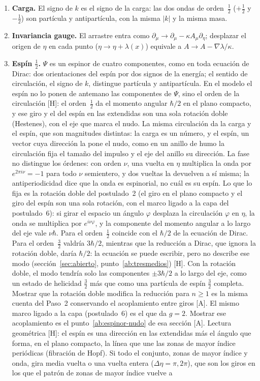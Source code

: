 \documentclass[11pt,a4paper]{article}
\newcommand{\st}[1]{\textup{[#1]}}
\begin{document}
\begin{enumerate}[label=\arabic*.,leftmargin=*]
\item \textbf{Carga.} El signo de $k$ es el signo de la carga: las dos ondas de orden~$\tfrac12$ ($+\tfrac12$ y $-\tfrac12$) son partícula y antipartícula, con la misma $|k|$ y la misma masa.

\item \textbf{Invariancia gauge.} El arrastre entra como $\partial_\mu\to\partial_\mu-\kappa A_\mu\partial_\eta$; desplazar el origen de $\eta$ en cada punto ($\eta\to\eta+\lambda(x)$) equivale a $A\to A-\nabla\lambda/\kappa$.

\item \label{it:espin}\textbf{Espín $\tfrac12$.} $\Psi$ es un espinor de cuatro componentes, como en toda ecuación de Dirac: dos orientaciones del espín por dos signos de la energía; el sentido de circulación, el signo de $k$, distingue partícula y antipartícula. En el modelo el espín no lo ponen de antemano las componentes de $\Psi$, sino el orden de la circulación \st{H}: el orden~$\tfrac12$ da el momento angular $\hbar/2$ en el plano compacto, y ese giro y el del espín en las extendidas son una sola rotación doble (Hestenes), con el eje que marca el nudo. La misma circulación da la carga y el espín, que son magnitudes distintas: la carga es un número, y el espín, un vector cuya dirección la pone el nudo, como en un anillo de humo la circulación fija el tamaño del impulso y el eje del anillo su dirección. La fase no distingue los órdenes: con orden $\nu$, una vuelta en $\eta$ multiplica la onda por $e^{2\pi i\nu}=-1$ para todo $\nu$ semientero, y dos vueltas la devuelven a sí misma; la antiperiodicidad dice que la onda es espinorial, no cuál es su espín. Lo que lo fija es la rotación doble del postulado~2 (el giro en el plano compacto y el giro del espín son una sola rotación, con el marco ligado a la capa del postulado~6): si girar el espacio un ángulo $\varphi$ desplaza la circulación $\varphi$ en $\eta$, la onda se multiplica por $e^{i\nu\varphi}$, y la componente del momento angular a lo largo del eje vale $\nu\hbar$. Para el orden~$\tfrac12$ coincide con el $\hbar/2$ de la ecuación de Dirac. Para el orden~$\tfrac32$ valdría $3\hbar/2$, mientras que la reducción a Dirac, que ignora la rotación doble, daría $\hbar/2$: la ecuación se puede escribir, pero no describe ese modo (sección~\ref{sec:abierto}, punto~\ref{ab:tresmedios}) \st{H}. Con la rotación doble, el modo tendría solo las componentes $\pm3\hbar/2$ a lo largo del eje, como un estado de helicidad $\tfrac32$ más que como una partícula de espín $\tfrac32$ completa. Mostrar que la rotación doble modifica la reducción para $n\ge1$ es la misma cuenta del Paso~2 conservando el acoplamiento entre giros \st{A}. El mismo marco ligado a la capa (postulado~6) es el que da $g=2$. Mostrar ese acoplamiento es el punto~\ref{ab:espinor-nudo} de esa sección \st{A}. Lectura geométrica \st{H}: el espín es una dirección en las extendidas más el ángulo que forma, en el plano compacto, la línea que une las zonas de mayor índice periódicas (fibración de Hopf). Si todo el conjunto, zonas de mayor índice y onda, gira media vuelta o una vuelta entera ($\Delta\eta=\pi,2\pi$), que son los giros en los que el patrón de zonas de mayor índice vuelve a 
\end{enumerate}
\end{document}
